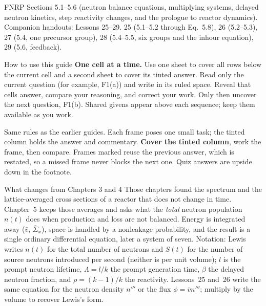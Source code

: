 \documentclass[compact]{ne630handout}
\newcommand{\vbar}{\bar v}
\newcommand{\Lam}{\Lambda}
\begin{document}
 {FNRP Sections 5.1--5.6 (neutron balance equations, multiplying systems, delayed neutron kinetics, step reactivity changes, and the prologue to reactor dynamics). Companion handouts: Lessons 25--29.}
 {25 (5.1--5.2 through Eq.~5.8), 26 (5.2--5.3), 27 (5.4, one precursor group), 28 (5.4--5.5, six groups and the inhour equation), 29 (5.6, feedback).}

\begin{KeyBox}{How to use this guide}
\ifguidehandwriting
\textbf{One cell at a time.} Use one sheet to cover all rows below the current cell and a second sheet to cover its tinted answer. Read only the current question (for example, F1(a)) and write in its ruled space. Reveal that cell\textquotesingle s answer, compare your reasoning, and correct your work. Only then uncover the next question, F1(b). Shared givens appear above each sequence; keep them available as you work.\par\smallskip
\fi
Same rules as the earlier guides. Each frame poses one small task; the tinted column holds the answer and commentary. \textbf{Cover the tinted column}, work the frame, then compare. Frames marked \Chain reuse the previous answer, which is restated, so a missed frame never blocks the next one. Quiz answers are upside down in the footnote.
\end{KeyBox}

\begin{KeyBox}{What changes from Chapters 3 and 4}
Those chapters found the spectrum and the lattice-averaged cross sections of a reactor that does not change in time. Chapter~5 keeps those averages and asks what the \emph{total} neutron population $n(t)$ does when production and loss are not balanced. Energy is integrated away ($\vbar$, $\overline\Sigma_x$), space is handled by a nonleakage probability, and the result is a single ordinary differential equation, later a system of seven. Notation: Lewis writes $n(t)$ for the total number of neutrons and $S(t)$ for the number of source neutrons introduced per second (neither is per unit volume); $l$ is the prompt neutron lifetime, $\Lam=l/k$ the prompt generation time, $\beta$ the delayed neutron fraction, and $\rho=(k-1)/k$ the reactivity. Lessons~25 and~26 write the same equation for the neutron density $n'''$ or the flux $\phi=\vbar n'''$; multiply by the volume to recover Lewis's form.
\end{KeyBox}
\end{document}
